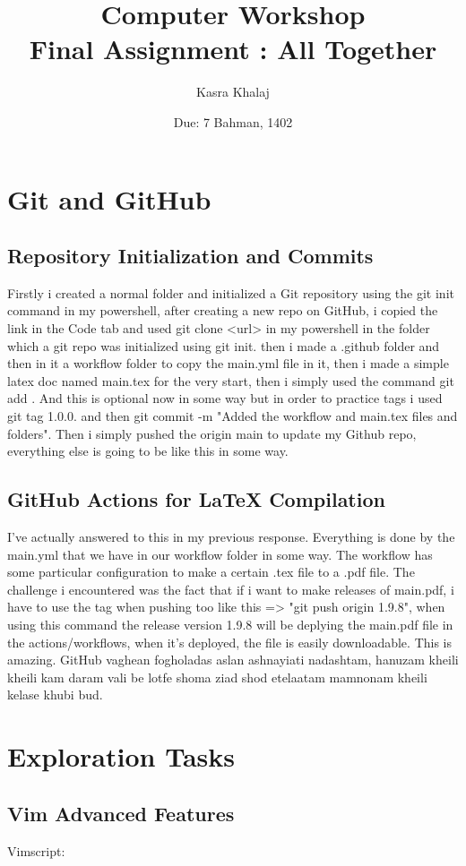 \documentclass[12pt, letterpaper]{article}
\title{Computer Workshop\\ Final Assignment : All Together}
\author{Kasra Khalaj}
\date{Due: 7 Bahman, 1402}
\begin{document}
\maketitle
\newpage
{}
\large

\tableofcontents
\section{Git and GitHub}
\subsection{ Repository Initialization and Commits}
Firstly i created a normal folder and initialized a Git repository using the git init command in my powershell, after creating a new repo on GitHub, i copied the link in the Code tab and used git clone <url> in my powershell in the folder which a git repo was initialized using git init. then i made a .github folder and then in it a workflow folder to copy the main.yml file in it, then i made a 
 simple latex doc named main.tex for the very start, then i simply used the command git add . And this is optional now in some way but in order to practice tags i used git tag 1.0.0. and then git commit -m "Added the workflow and main.tex files and folders". Then i simply pushed the origin main to update my Github repo, everything else is going to be like this in some way.
 \subsection{GitHub Actions for LaTeX Compilation}
 I've actually answered to this in my previous response. Everything is done by the main.yml that we have in our workflow folder in some way. The workflow has some particular configuration to make a certain .tex file to a .pdf file. The challenge i encountered was the fact that if i want to make releases of main.pdf, i have to use the tag when pushing too like this => "git push origin 1.9.8", when using this command the release version 1.9.8 will be deplying the main.pdf file in the actions/workflows, when it's deployed, the file is easily downloadable. This is amazing. GitHub vaghean fogholadas aslan ashnayiati nadashtam, hanuzam kheili kheili kam daram vali be lotfe shoma ziad shod etelaatam mamnonam kheili kelase khubi bud.
\section{ Exploration Tasks}
\subsection{Vim Advanced Features}
 Vimscript:
\end{document}
